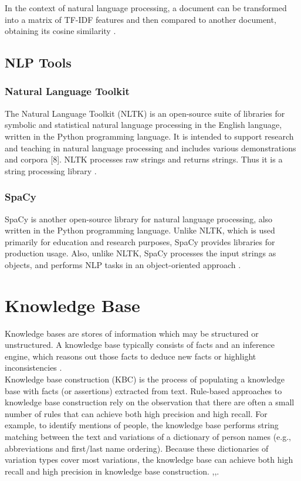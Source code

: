 \documentclass[10pt,11pt,12pt,oneside]{book}
\begin{document}
		In the context of natural language processing, a document can be transformed into a matrix of TF-IDF features and then compared to another document, obtaining its cosine similarity \cite{huang}.
	
	\subsection{NLP Tools}
	
		\subsubsection{Natural Language Toolkit}
			The Natural Language Toolkit (NLTK) is an open-source suite of libraries for symbolic and statistical natural language processing in the English language, written in the Python programming language. It is intended to support research and teaching in natural language processing and includes various demonstrations and corpora [8]. NLTK processes raw strings and returns strings. Thus it is a string processing library \cite {aho_lam_sethi_ullman_2006}.
		
		\subsubsection{SpaCy}
			SpaCy is another open-source library for natural language processing, also written in the Python programming language. Unlike NLTK, which is used primarily for education and research purposes, SpaCy provides libraries for production usage. Also, unlike NLTK, SpaCy processes the input strings as objects, and performs NLP tasks in an object-oriented approach \cite {aho_lam_sethi_ullman_2006}.
	
	
	
	\section{Knowledge Base}
	Knowledge bases are stores of information which may be structured or unstructured. A knowledge base typically consists of facts and an inference engine, which reasons out those facts to deduce new facts or highlight inconsistencies \cite {scholl_2016}.\\
	
	Knowledge base construction (KBC) is the process of populating a knowledge base with facts (or assertions) extracted from text. Rule-based approaches to knowledge base construction rely on the observation that there are often a small number of rules that can achieve both high precision and high recall. For example, to identify mentions of people, the knowledge base performs string matching between the text and variations of a dictionary of person names (e.g., abbreviations and first/last name ordering). Because these dictionaries of variation types cover most variations, the knowledge base can achieve both high recall and high precision in knowledge base construction. \cite{hayes1983building},\cite{arasu2003extracting},\cite{mooney1999relational}.\\
	
\end{document}
